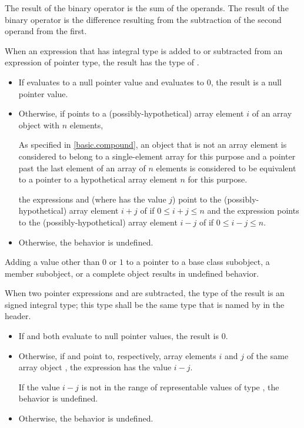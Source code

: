 \pnum
The result of the binary \tcode{+} operator is the sum of the operands.
The result of the binary \tcode{-} operator is the difference resulting
from the subtraction of the second operand from the first.

\pnum
{}%
When an expression  that has integral type
is added to or subtracted from an expression  of pointer type,
the result has the type of .
\begin{itemize}
\item If  evaluates to a null pointer value and
 evaluates to 0, the result is a null pointer value.
\item Otherwise, if  points to a (possibly-hypothetical) array element $i$
of an array object  with $n$ elements,
\begin{footnote}
As specified in \ref{basic.compound},
an object that is not an array element
is considered to belong to a single-element array for this purpose and
a pointer past the last element of an array of $n$ elements
is considered to be equivalent to a pointer to a hypothetical array element
$n$ for this purpose.
\end{footnote}
the expressions  and 
(where  has the value $j$)
point to the (possibly-hypothetical) array element
$i + j$ of  if $0 \le i + j \le n$
and the expression 
points to the (possibly-hypothetical) array element
$i - j$ of  if $0 \le i - j \le n$.
\item Otherwise, the behavior is undefined.
\end{itemize}
\begin{note}
Adding a value other than $0$ or $1$
to a pointer to a base class subobject, a member subobject,
or a complete object results in undefined behavior.
\end{note}

\pnum
{}%
%
%
%
When two pointer expressions  and  are subtracted,
the type of the result is an  signed
integral type; this type shall be the same type that is named by
 in the 
header.
\begin{itemize}
\item If  and  both evaluate to null pointer values,
the result is 0.
\item Otherwise, if  and  point to, respectively,
array elements $i$ and $j$
of the same array object ,
the expression  has the value $i - j$.
\begin{note}
If the value $i - j$
is not in the range of representable values
of type ,
the behavior is undefined.
\end{note}
\item Otherwise, the behavior is undefined.
\end{itemize}

